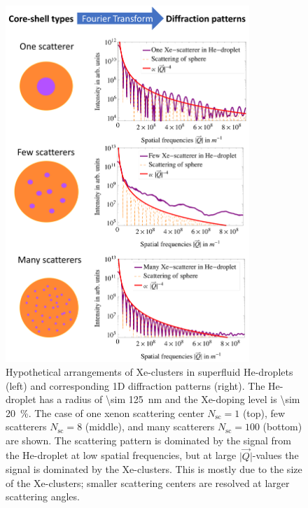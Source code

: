 \begin{figure}
 	\centering
 		\includegraphics[width=0.82\textwidth]{images/results/plum-pudding.png}
 	\caption[Hypothetical arrangements of Xe-clusters within He-droplets.]{Hypothetical arrangements of Xe-clusters in superfluid He-droplets (left) and corresponding 1D diffraction patterns (right). The He-droplet has a radius of \SI{\sim 125}{\nano\meter} and the Xe-doping level is \SI{\sim 20}{\percent}. The case of one xenon scattering center $N_{\text{sc}}=1$ (top), few scatterers $N_{\text{sc}}=8$ (middle), and many scatterers $N_{\text{sc}}=100$ (bottom) are shown. The scattering pattern is dominated by the signal from the He-droplet at low spatial frequencies, but at large $\lvert\vec{Q}\rvert$-values the signal is dominated by the Xe-clusters. This is mostly due to the size of the Xe-clusters; smaller scattering centers are resolved at larger scattering angles.}
 	\label{fig:HeXe-plum-pudding}
\end{figure}
